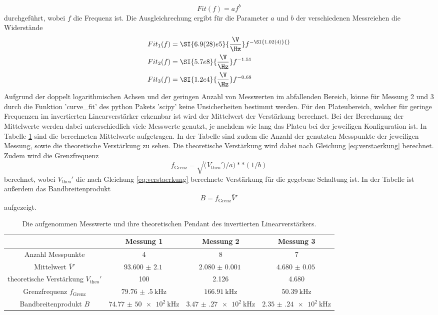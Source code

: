 \begin{equation}
    Fit(f) = a f^b
    \label{eq:fit}
\end{equation}
durchgeführt, wobei $f$ die Frequenz ist.
Die Ausgleichrechung ergibt für die Parameter $a$ und $b$ der verschiedenen Messreiehen die Widerstände
\begin{align}
    Fit_1(f) &= \SI{6.9(28)e5}{\frac{\V}{\Hz}} f^{-\SI{1.02(4)}{}} \\
    Fit_2(f) &= \SI{5.7e8}{\frac{\V}{\Hz}} f^{-1.51}\\
    Fit_3(f) &= \SI{1.2e4}{\frac{\V}{\Hz}} f^{-0.68}
\end{align}
Aufgrund der doppelt logarithmischen Achsen und der geringen Anzahl von Messwerten im abfallenden Bereich, könne für Messung 2 und 3 durch die Funktion 'curve\_fit' des python Pakets 'scipy' \cite{scipy} keine Unsicherheiten bestimmt werden.
Für den Plateubereich, welcher für geringe Frequenzen im invertierten Linearverstärker erkennbar ist wird der Mittelwert der Verstärkung berechnet.
Bei der Berechnung der Mittelwerte werden dabei unterschiedlich viele Messwerte genutzt, je nachdem wie lang das Plateu bei der jeweiligen Konfiguration ist.
In Tabelle \ref{tab:inv_lin_mittel} sind die berechneten Mittelwerte aufgetragen. 
In der Tabelle sind zudem die Anzahl der genutzten Messpunkte der jeweiligen Messung, sowie die theoretische Verstärkung zu sehen.
Die theoretische Verstärkung wird dabei nach Gleichung \eqref{eq:verstaerkung} berechnet.
Zudem wird die Grenzfrequenz 
\begin{equation*}
  f_\text{Grenz} = \sqrt(V_\text{theo}')/a)**(1/b)
\end{equation*}
berechnet, wobei $V_\text{theo}'$ die nach Gleichung \eqref{eq:verstaerkung} berechnete Verstärkung für die gegebene Schaltung ist.
In der Tabelle ist außerdem das Bandbreitenprodukt
\begin{equation*}
    B = f_\text{Grenz}\bar{V}'
\end{equation*}
aufgezeigt.
\begin{table}
    \hspace*{-2cm}\begin{tabular}{cccc}
        \toprule
         & Messung 1 & Messung 2 & Messung 3\\
        \midrule
        Anzahl Messpunkte & 4 & 8 & 7 \\
        Mittelwert $\bar{V}'$ & $\SI{93.600(2100)}{}$ &  $\SI{2.080(1)}{} $&  $\SI{4.680(50)}{} $ \\
        theoretische Verstärkung $V_\text{theo}'$ & 100 & 2.126 & 4.680 \\
        Grenzfrequenz $f_\text{Grenz}$ & $\SI{79.76(50)}{\kilo\Hz}$ & $\SI{166.91}{\kilo\Hz} $& $\SI{50.39}{\kilo\Hz}$  \\
        Bandbreitenprodukt $B$ & $\SI{74.77(5000)e2}{\kilo\Hz}$ & $\SI{3.47(27)e2}{\kilo\Hz}$ & $\SI{2.35(24)e2}{\kilo\Hz}$ \\
        \bottomrule
    \end{tabular}
    \caption{Die aufgenommen Messwerte und ihre theoretischen Pendant des invertierten Linearverstärkers.}
    \label{tab:inv_lin_mittel}
\end{table} 
